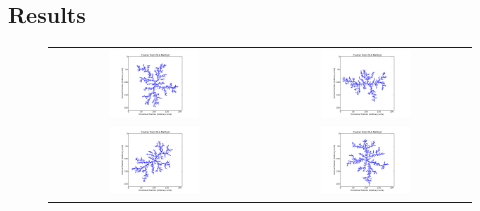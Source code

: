 \documentclass[a4paper,12pt]{article}
\begin{document}
\subsection{Results}
\vspace*{-.5cm}
\begin{figure}[H]
\centering
        \begin{tabular}{@{}cc@{}}
                \includegraphics[width = 0.45\textwidth]{pics/DLA_crystal_final_1.pdf} &
                \includegraphics[width = 0.45\textwidth]{pics/DLA_crystal_final_2.pdf} \\
                \includegraphics[width = 0.45\textwidth]{pics/DLA_crystal_final_3.pdf} &
                \includegraphics[width = 0.45\textwidth]{pics/DLA_crystal_final_4.pdf} \\

\end{tabular}
\end{figure}
\end{document}
